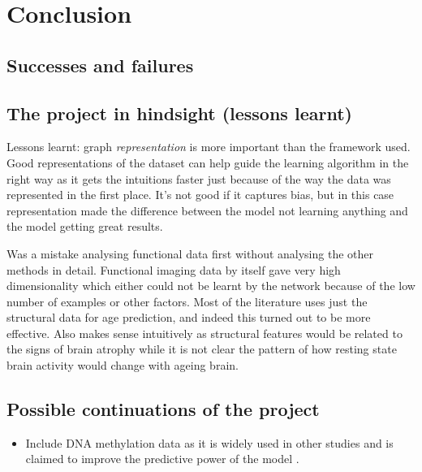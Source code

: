 \chapter{Conclusion}


\section{Successes and failures}

\section{The project in hindsight (lessons learnt)}
Lessons learnt: graph \textit{representation} is more important than the framework used. Good representations of the dataset can help guide the learning algorithm in the right way as it gets the intuitions faster just because of the way the data was represented in the first place. It's not good if it captures bias, but in this case representation made the difference between the model not learning anything and the model getting great results.

Was a mistake analysing functional data first without analysing the other methods in detail. Functional imaging data by itself gave very high dimensionality which either could not be learnt by the network because of the low number of examples or other factors. Most of the literature uses just the structural data for age prediction, and indeed this turned out to be more effective. Also makes sense intuitively as structural features would be related to the signs of brain atrophy while it is not clear the pattern of how resting state brain activity would change with ageing brain.


\section{Possible continuations of the project}
\begin{itemize}
    \item Include DNA methylation data as it is widely used in other studies and is claimed to improve the predictive power of the model \cite{cole2018brain}.
\end{itemize}
